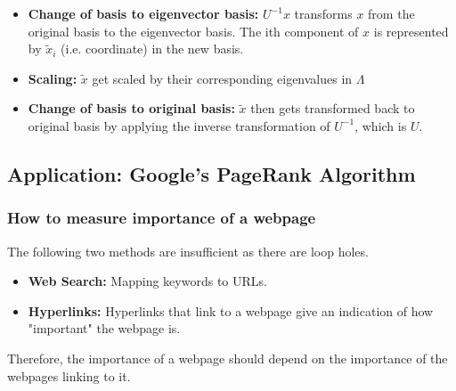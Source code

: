 \begin{warning}
    \begin{itemize}
        \item \textbf{Change of basis to eigenvector basis:} $U^{-1} x$ transforms $x$ from the original basis to the eigenvector basis. The ith component of $x$ is represented by $\tilde{x}_i$ (i.e. coordinate) in the new basis.
        \item \textbf{Scaling:} $\tilde{x}$ get scaled by their corresponding eigenvalues in $\Lambda$
        \item \textbf{Change of basis to original basis:} $\tilde{x}$ then gets transformed back to original basis by applying the inverse transformation of $U^{-1}$, which is $U$.
    \end{itemize}
\end{warning}

\subsection{Application: Google's PageRank Algorithm}
\subsubsection{How to measure importance of a webpage}
\begin{intuition}
    The following two methods are insufficient as there are loop holes.
    \begin{itemize}
        \item \textbf{Web Search:} Mapping keywords to URLs. 
        \item \textbf{Hyperlinks:} Hyperlinks that link to a webpage give an indication of how "important" the webpage is. 
    \end{itemize}
    \vspace{1em}

    Therefore, the importance of a webpage should depend on the importance of the webpages linking to it.
\end{intuition}

